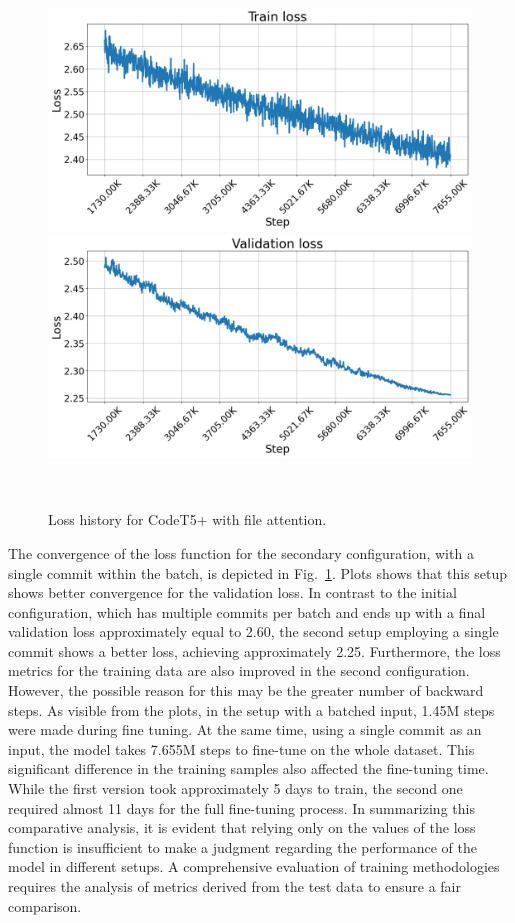 \begin{figure}[H]   
    \centering
    \includegraphics[scale=0.4]{figs/file_attn_train_loss_single.png}
    \includegraphics[scale=0.4]{figs/file_attn_val_loss_single.png}
    \caption{Loss history for CodeT5+ with file attention.}
    ~\label{fig:loss_hist_file_attn_single}
\end{figure}

The convergence of the loss function for the secondary configuration, with a single commit within the batch, is depicted in Fig.~\ref{fig:loss_hist_file_attn_single}. Plots shows that this setup shows better convergence for the validation loss. In contrast to the initial configuration, which has multiple commits per batch and ends up with a final validation loss approximately equal to 2.60, the second setup employing a single commit shows a better loss, achieving approximately 2.25. Furthermore, the loss metrics for the training data are also improved in the second configuration. However, the possible reason for this may be the greater number of backward steps. As visible from the plots, in the setup with a batched input, 1.45M steps were made during fine tuning. At the same time, using a single commit as an input, the model takes 7.655M steps to fine-tune on the whole dataset. This significant difference in the training samples also affected the fine-tuning time. While the first version took approximately 5 days to train, the second one required almost 11 days for the full fine-tuning process.
In summarizing this comparative analysis, it is evident that relying only on the values of the loss function is insufficient to make a judgment regarding the performance of the model in different setups. A comprehensive evaluation of training methodologies requires the analysis of metrics derived from the test data to ensure a fair comparison. 